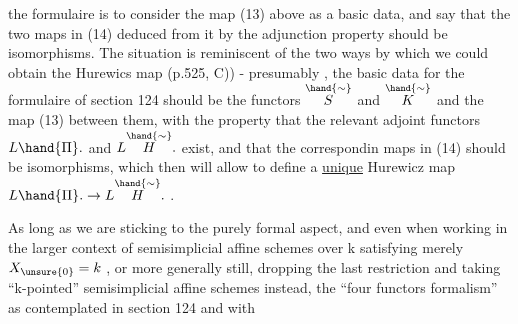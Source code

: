 the formulaire is to consider the map (13) above as a basic data, and
say that the two maps in (14) deduced from it by the adjunction property
should be isomorphisms. The situation is reminiscent of the two ways
by which we could obtain the Hurewics map (p.525, C)) - presumably ,
the basic data for the formulaire of section 124 should be the functors
$\overset{\hand{\sim}}{S}$ and $\overset{\hand{\sim}}{K}$ and the map  (13) between them, with the property that the
relevant adjoint functors $L\hand{\Pi}.$ and $L\overset{\hand{\sim}}{H}.$ exist, and that the correspondin
maps in (14) should be isomorphisms, which then will allow to define
a \uline{unique} Hurewicz map $L\hand{\Pi}. \rightarrow L\overset{\hand{\sim}}{H}.$ .

As long as we are sticking to the purely formal aspect, and even
when working in the larger context of semisimplicial affine schemes over
k satisfying merely $X_{\unsure{0}}=k$ , or more generally still, dropping the last
restriction and taking ``k-pointed'' semisimplicial affine schemes instead,
the  ``four functors formalism''  as contemplated in section 124\xout{,} \hand{(}and with
